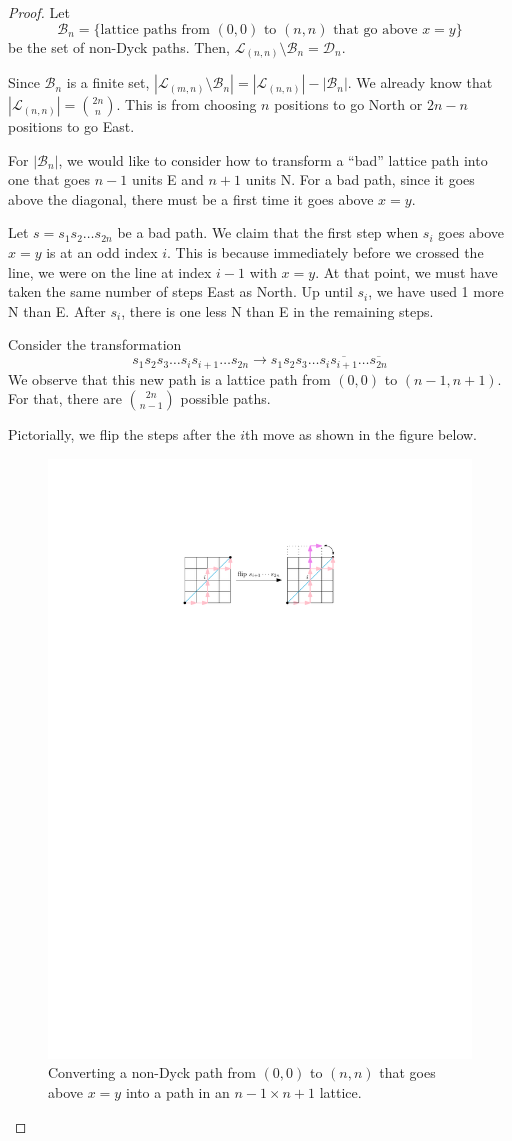 \begin{proof}
    Let
    $$
    \mathcal{B}_{n} = \{ \text{lattice paths from $(0,0)$ to $(n,n)$ that go above $x=y$} \}
    $$
    be the set of non-Dyck paths. Then, $\mathcal{L}_{(n,n)} \setminus \mathcal{B}_n = \mathcal{D}_n$.

    Since $\mathcal{B}_n$ is a finite set, $|\mathcal{L}_{(m,n)} \setminus \mathcal{B}_n| = |\mathcal{L}_{(n,n)}| - |\mathcal{B}_n|$. We already know that $|\mathcal{L}_{(n,n)}| = \binom{2n}{n}$. This is from choosing $n$ positions to go North or $2n-n$ positions to go East.

    For $|\mathcal{B}_n|$, we would like to consider how to transform a ``bad'' lattice path into one that goes $n-1$ units E and $n+1$ units N. For a bad path, since it goes above the diagonal, there must be a first time it goes above $x=y$.

    Let $s = s_1s_2\ldots s_{2n}$ be a bad path. We claim that the first step when $s_i$ goes above $x=y$ is at an odd index $i$. This is because immediately before we crossed the line, we were on the line at index $i-1$ with $x=y$. At that point, we must have taken the same number of steps East as North. Up until $s_i$, we have used 1 more N than E. After $s_i$, there is one less N than E in the remaining steps.

    Consider the transformation 
    $$
    s_1s_2s_3\ldots s_i s_{i+1} \ldots s_{2n} \to s_1s_2s_3 \ldots s_i \overline{s_{i+1}} \ldots \overline{s_{2n}}
    $$
    We observe that this new path is a lattice path from $(0,0)$ to $(n-1,n+1)$. For that, there are $\binom{2n}{n-1}$ possible paths.

    Pictorially, we flip the steps after the $i$th move as shown in the figure below.

    \begin{figure}[htbp]
        \centering
        \includegraphics[width=0.5\linewidth]{figures/catalan-number-proof.pdf}
        \caption{Converting a non-Dyck path from $(0,0)$ to $(n,n)$ that goes above $x=y$ into a path in an $n-1 \times n+1$ lattice.}
        \label{fig:catalan-number-proof}
    \end{figure}
\end{proof}